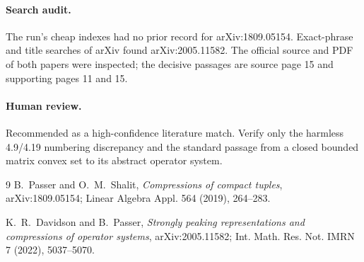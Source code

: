 \documentclass[11pt]{article}
\begin{document}
\paragraph{Search audit.}
The run's cheap indexes had no prior record for arXiv:1809.05154.  Exact-phrase
and title searches of arXiv found arXiv:2005.11582.  The official source and
PDF of both papers were inspected; the decisive passages are source page 15
and supporting pages 11 and 15.

\paragraph{Human review.}
Recommended as a high-confidence literature match.  Verify only the harmless
4.9/4.19 numbering discrepancy and the standard passage from a closed bounded
matrix convex set to its abstract operator system.

\begin{thebibliography}{9}
B.~Passer and O.~M.~Shalit,
\emph{Compressions of compact tuples}, arXiv:1809.05154;
Linear Algebra Appl. 564 (2019), 264--283.

K.~R.~Davidson and B.~Passer,
\emph{Strongly peaking representations and compressions of operator systems},
arXiv:2005.11582; Int. Math. Res. Not. IMRN 7 (2022), 5037--5070.
\end{thebibliography}
\end{document}
